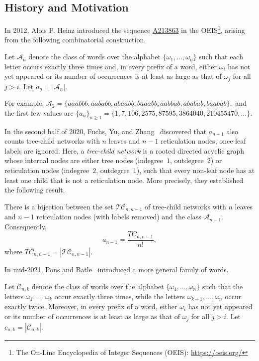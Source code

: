 \documentclass[a4paper,UKenglish,cleveref, autoref, thm-restate]{lipics-v2021}
\newcommand{\oeis}[1]{\href{http://oeis.org/#1}{#1}}
\begin{document}
\subsection{History and Motivation}
In 2012, Alois P. Heinz introduced the sequence \oeis{A213863} in the OEIS\footnote{The On-Line Encyclopedia of Integer Sequences (OEIS): \url{https://oeis.org/}}, arising from the following combinatorial construction.

\begin{definition}\label{an}
Let $\mathcal{A}_n$ denote the class of words over the alphabet $\{\omega_1, \dots, \omega_n\}$ such that each letter occurs exactly three times and, in every prefix of a word, either $\omega_i$ has not yet appeared or its number of occurrences is at least as large as that of $\omega_j$ for all $j>i$. Let $a_n = |\mathcal{A}_n|$.
\end{definition}

For example,
$
\mathcal{A}_2 = \{aaabbb, aababb, abaabb, baaabb, aabbab, ababab, baabab\},
$
and the first few values are
$
\{a_n\}_{n\ge1} = \{1, 7, 106, 2575, 87595, 3864040, 210455470, \dots\}.
$

In the second half of 2020, Fuchs, Yu, and Zhang~\cite{fuchs2021asymptotic} discovered that $a_{n-1}$ also counts tree-child networks with $n$ leaves and $n-1$ reticulation nodes, once leaf labels are ignored. Here, a \emph{tree-child network} is a rooted directed acyclic graph whose internal nodes are either tree nodes (indegree~$1$, outdegree~$2$) or reticulation nodes (indegree~$2$, outdegree~$1$), such that every non-leaf node has at least one child that is not a reticulation node. More precisely, they established the following result.

\begin{proposition}
There is a bijection between the set $\mathcal{TC}_{n,n-1}$ of tree-child networks with $n$ leaves and $n-1$ reticulation nodes (with labels removed) and the class $\mathcal{A}_{n-1}$. Consequently,
\[
a_{n-1} = \frac{TC_{n,n-1}}{n!},
\]
where $TC_{n,n-1} = |\mathcal{TC}_{n,n-1}|$.
\end{proposition}

In mid-2021, Pons and Batle~\cite{BatlePons2021Phylo} introduced a more general family of words.

\begin{definition}\label{def:PonsBatleWords}
Let $\mathcal{C}_{n,k}$ denote the class of words over the alphabet $\{\omega_1, \dots, \omega_n\}$ such that the letters $\omega_1,\dots,\omega_k$ occur exactly three times, while the letters $\omega_{k+1},\dots,\omega_n$ occur exactly twice. Moreover, in every prefix of a word, either $\omega_i$ has not yet appeared or its number of occurrences is at least as large as that of $\omega_j$ for all $j>i$. Let $c_{n,k} = |\mathcal{C}_{n,k}|$.
\end{definition}
\end{document}
